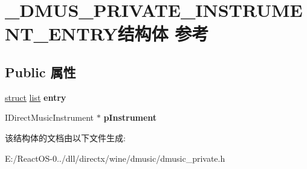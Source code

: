 \hypertarget{struct___d_m_u_s___p_r_i_v_a_t_e___i_n_s_t_r_u_m_e_n_t___e_n_t_r_y}{}\section{\+\_\+\+D\+M\+U\+S\+\_\+\+P\+R\+I\+V\+A\+T\+E\+\_\+\+I\+N\+S\+T\+R\+U\+M\+E\+N\+T\+\_\+\+E\+N\+T\+R\+Y结构体 参考}
\label{struct___d_m_u_s___p_r_i_v_a_t_e___i_n_s_t_r_u_m_e_n_t___e_n_t_r_y}
\subsection*{Public 属性}
\begin{DoxyCompactItemize}
\item 
\mbox{\label{struct___d_m_u_s___p_r_i_v_a_t_e___i_n_s_t_r_u_m_e_n_t___e_n_t_r_y_a4a13dd1dedf119c65e1529dc14dc5a45}} 
\hyperlink{interfacestruct}{struct} \hyperlink{classlist}{list} {\bfseries entry}
\item 
\mbox{\label{struct___d_m_u_s___p_r_i_v_a_t_e___i_n_s_t_r_u_m_e_n_t___e_n_t_r_y_a936fe24659a1b19276c55077800c23f7}} 
I\+Direct\+Music\+Instrument $\ast$ {\bfseries p\+Instrument}
\end{DoxyCompactItemize}


该结构体的文档由以下文件生成\+:\begin{DoxyCompactItemize}
\item 
E\+:/\+React\+O\+S-\/0../dll/directx/wine/dmusic/dmusic\+\_\+private.\+h\end{DoxyCompactItemize}
